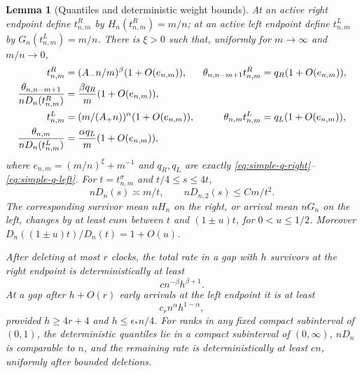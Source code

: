 \documentclass[11pt]{article}
\newtheorem{lemma}[theorem]{Lemma}
\theoremstyle{remark}
\theoremstyle{plain}
\begin{document}
\begin{lemma}[Quantiles and deterministic weight bounds]
\label{lem:sp-quantiles}
At an active right endpoint define $t^R_{n,m}$ by
$H_n(t^R_{n,m})=m/n$; at an active left endpoint define $t^L_{n,m}$
by $G_n(t^L_{n,m})=m/n$.  There is $\xi>0$ such that, uniformly for
$m\to\infty$ and $m/n\to0$,
\begin{align}
 t^R_{n,m}&=(A_-n/m)^\beta(1+O(e_{n,m})),&
 \theta_{n,n-m+1}t^R_{n,m}&=q_R(1+O(e_{n,m})),\notag\\
 \frac{\theta_{n,n-m+1}}{nD_n(t^R_{n,m})}
  &=\frac{\beta q_R}{m}(1+O(e_{n,m})),
 &&\label{eq:sp-right-quantile}\\
 t^L_{n,m}&=(m/(A_+n))^\alpha(1+O(e_{n,m})),&
 \theta_{n,m}t^L_{n,m}&=q_L(1+O(e_{n,m})),\notag\\
 \frac{\theta_{n,m}}{nD_n(t^L_{n,m})}
  &=\frac{\alpha q_L}{m}(1+O(e_{n,m})),
 &&\label{eq:sp-left-quantile}
\end{align}
where $e_{n,m}=(m/n)^\xi+m^{-1}$ and $q_R,q_L$ are exactly
\eqref{eq:simple-q-right}--\eqref{eq:simple-q-left}.
For $t=t^\sigma_{n,m}$ and $t/4\le s\le4t$,
\begin{equation}
 nD_n(s)\asymp m/t,\qquad nD_{n,2}(s)\le Cm/t^2.
 \label{eq:sp-rough-moments}
\end{equation}
The corresponding survivor mean $nH_n$ on the right, or arrival mean
$nG_n$ on the left, changes by at least $cum$ between $t$ and
$(1\pm u)t$, for $0<u\le1/2$.  Moreover
$D_n((1\pm u)t)/D_n(t)=1+O(u)$.

After deleting at most $r$ clocks, the total rate in a gap with $h$
survivors at the right endpoint is deterministically at least
\begin{equation}
 c n^{-\beta}h^{\beta+1}.
 \label{eq:sp-right-weight-floor}
\end{equation}
At a gap after $h+O(r)$ early arrivals at the left endpoint it is at least
\begin{equation}
 c_r n^\alpha h^{1-\alpha},
 \label{eq:sp-left-weight-floor}
\end{equation}
provided $h\ge4r+4$ and $h\le\epsilon_* n/4$.
For ranks in any fixed compact subinterval of $(0,1)$, the deterministic
quantiles lie in a compact subinterval of $(0,\infty)$, $nD_n$ is
comparable to $n$, and the remaining rate is deterministically at least
$c n$, uniformly after bounded deletions.
\end{lemma}
\end{document}
